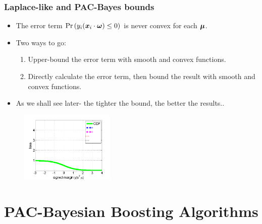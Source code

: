 \documentclass[mathserif]{beamer}
\begin{document}
\begin{frame}
\frametitle{ Laplace-like and PAC-Bayes bounds  }
\begin{itemize}
\item The error term $\Pr\left({ y_{i}({\boldsymbol{x}}_{i}\cdot{\boldsymbol{\omega}})\leq0}\right)$ is never convex for each ${\boldsymbol{\mu}}$.
\item Two ways to go:
\begin{enumerate}
\item Upper-bound the error term with smooth and convex functions.
\item Directly calculate the error term,  then bound the result
with  smooth and convex functions.
\end{enumerate}
\item As we shall see later- the tighter the bound, the better the results..
\end{itemize}
\begin{figure}
\includegraphics[width=0.4\textwidth]{figs/losses_cdf}
\end{figure}
\end{frame}

\section{PAC-Bayesian Boosting Algorithms}
\end{document}
